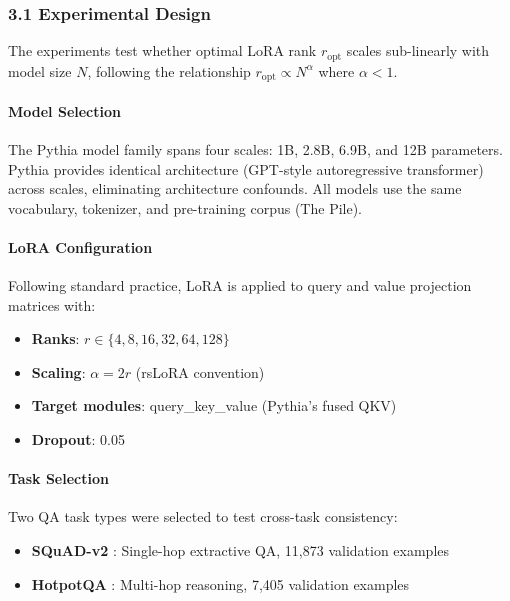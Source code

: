 
\subsubsection{3.1 Experimental Design}

The experiments test whether optimal LoRA rank $r_{\text{opt}}$ scales sub-linearly with model size $N$, following the relationship $r_{\text{opt}} \propto N^{\alpha}$ where $\alpha < 1$.

\paragraph{Model Selection}

The Pythia model family \citep{biderman2023pythia} spans four scales: 1B, 2.8B, 6.9B, and 12B parameters. Pythia provides identical architecture (GPT-style autoregressive transformer) across scales, eliminating architecture confounds. All models use the same vocabulary, tokenizer, and pre-training corpus (The Pile).

\paragraph{LoRA Configuration}

Following standard practice, LoRA is applied to query and value projection matrices with:
\begin{itemize}
\item \textbf{Ranks}: $r \in \{4, 8, 16, 32, 64, 128\}$
\item \textbf{Scaling}: $\alpha = 2r$ (rsLoRA convention)
\item \textbf{Target modules}: query\_key\_value (Pythia's fused QKV)
\item \textbf{Dropout}: 0.05
\end{itemize}

\paragraph{Task Selection}

Two QA task types were selected to test cross-task consistency:
\begin{itemize}
\item \textbf{SQuAD-v2} \citep{rajpurkar2018squad}: Single-hop extractive QA, 11,873 validation examples
\item \textbf{HotpotQA} \citep{yang2018hotpotqa}: Multi-hop reasoning, 7,405 validation examples
\end{itemize}

